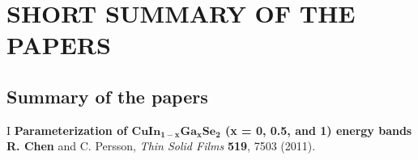 \documentclass[a4paper, 12pt, titlepage,oneside,drop]{kthesis}
\begin{document}

\chapter{SHORT SUMMARY OF THE PAPERS}

\section{Summary of the papers}

I \textbf{Parameterization of $\mathbf {CuIn_{1-x}Ga_{x}Se_2}$ (x = 0, 0.5, and 1) energy bands}
\\\textbf{R. Chen} and C. Persson, \textit{Thin Solid Films} {\textbf {519}}, 7503 (2011).
\end{document}
